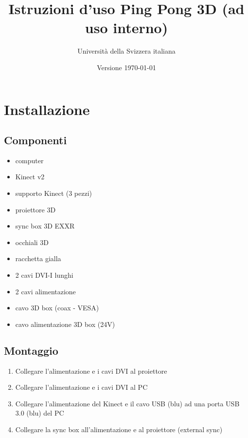 \documentclass[12pt]{article}
\title{Istruzioni d'uso Ping Pong 3D (ad uso interno)}
\author{Università della Svizzera italiana}
\date{Versione \today}
\begin{document}
\maketitle
\tableofcontents
\newpage


\section{Installazione}\label{installation}	

	\subsection{Componenti}
	
		\begin{itemize}
			\item computer
			\item Kinect v2
			\item supporto Kinect (3 pezzi)
			\item proiettore 3D
			\item sync box 3D EXXR
			\item occhiali 3D
			\item racchetta gialla
			\item 2 cavi DVI-I lunghi
			\item 2 cavi alimentazione
			\item cavo 3D box (coax - VESA)
			\item cavo alimentazione 3D box (24V)
		\end{itemize}
		
		
	\subsection{Montaggio}
	
		\begin{enumerate}
			\item Collegare l'alimentazione e i cavi DVI al proiettore
			\item Collegare l'alimentazione e i cavi DVI al PC
			\item Collegare l'alimentazione del Kinect e il cavo USB (blu) ad una porta USB 3.0 (blu) del PC
			\item Collegare la sync box all'alimentazione e al proiettore (external sync)
		\end{enumerate}
		
\end{document}

